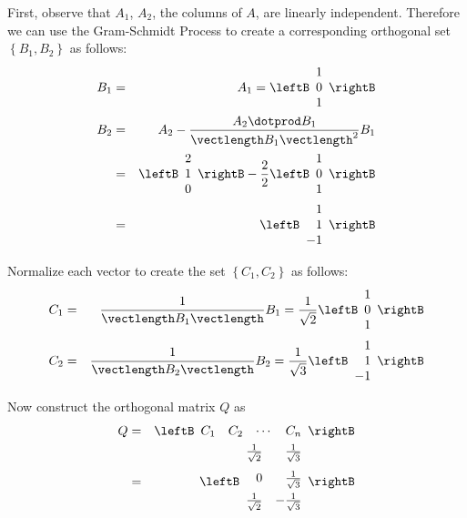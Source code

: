 \begin{solution}
First, observe that $A_1$, $A_2$, the columns of $A$, are linearly independent. Therefore we can use the Gram-Schmidt Process to create a corresponding orthogonal set $\left\{ B_1, B_2 \right\}$ as follows:
\begin{eqnarray*}
B_1 &=& A_1 = \leftB \begin{array}{r}
1 \\
0 \\
1
\end{array} \rightB \\
B_2 &=& A_2 - \frac{A_2 \dotprod B_1}{\vectlength B_1 \vectlength ^2} B_1 \\
&=& \leftB \begin{array}{r}
2 \\
1 \\
0
\end{array}
\rightB
- \frac{2}{2} \leftB \begin{array}{r}
1 \\
0 \\
1
\end{array} \rightB \\
&=& 
\leftB
\begin{array}{r}
1 \\
1 \\
-1
\end{array}
\rightB
\end{eqnarray*}

Normalize each vector to create the set $\left\{ C_1, C_2 \right\}$ as follows:
\begin{eqnarray*}
C_1 &=& \frac{1}{\vectlength B_1 \vectlength} B_1 = \frac{1}{\sqrt{2}}  \leftB \begin{array}{r}
1 \\
0 \\
1
\end{array} \rightB \\
C_2 &=& \frac{1}{\vectlength B_2 \vectlength} B_2 = \frac{1}{\sqrt{3}} \leftB \begin{array}{r}
1 \\
1 \\
-1 
\end{array}\rightB
\end{eqnarray*}

Now construct the orthogonal matrix $Q$ as 
\begin{eqnarray*}
Q &=& \leftB 
\begin{array}{cccc}
C_1 & C_2 & \cdots & C_n 
\end{array}
\rightB \\
&=& \leftB
\begin{array}{rr}
\vspace{0.05in}\frac{1}{\sqrt{2}} & \vspace{0.05in}\frac{1}{\sqrt{3}} \\
0  & \vspace{0.05in}\frac{1}{\sqrt{3}} \\
\vspace{0.05in}\frac{1}{\sqrt{2}} & -\vspace{0.05in}\frac{1}{\sqrt{3}}
\end{array}
\rightB
\end{eqnarray*}


\end{solution}
